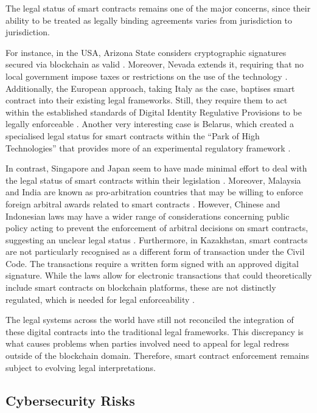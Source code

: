 The legal status of smart contracts remains one of the major concerns, since their ability to be treated as legally binding agreements varies from jurisdiction to jurisdiction. 

For instance, in the USA, Arizona State considers cryptographic signatures secured via blockchain as valid \cite{GilcrestEtAl2018}. Moreover, Nevada extends it, requiring that no local government impose taxes or restrictions on the use of the technology \cite{GilcrestEtAl2018}. Additionally, the European approach, taking Italy as the case, baptises smart contract into their existing legal frameworks. Still, they require them to act within the established standards of Digital Identity Regulative Provisions to be legally enforceable \cite{Ferreira2021}. Another very interesting case is Belarus, which created a specialised legal status for smart contracts within the ``Park of High Technologies'' that provides more of an experimental regulatory framework \cite{Ferreira2021}.

In contrast, Singapore and Japan seem to have made minimal effort to deal with the legal status of smart contracts within their legislation \cite{Ferreira2021}. Moreover, Malaysia and India are known as pro-arbitration countries that may be willing to enforce foreign arbitral awards related to smart contracts \cite{Goh2022}. However,  Chinese and Indonesian laws may have a wider range of considerations concerning public policy acting to prevent the enforcement of arbitral decisions on smart contracts, suggesting an unclear legal status \cite{Goh2022}. Furthermore, in Kazakhstan, smart contracts are not particularly recognised as a different form of transaction under the Civil Code. The transactions require a written form signed with an approved digital signature. While the laws allow for electronic transactions that could theoretically include smart contracts on blockchain platforms, these are not distinctly regulated, which is needed for legal enforceability \cite{LegalAdvisoryKazakhstanLtd}. 

The legal systems across the world have still not reconciled the integration of these digital contracts into the traditional legal frameworks. This discrepancy is what causes problems when parties involved need to appeal for legal redress outside of the blockchain domain. Therefore, smart contract enforcement remains subject to evolving legal interpretations.

\subsection{Cybersecurity Risks}

